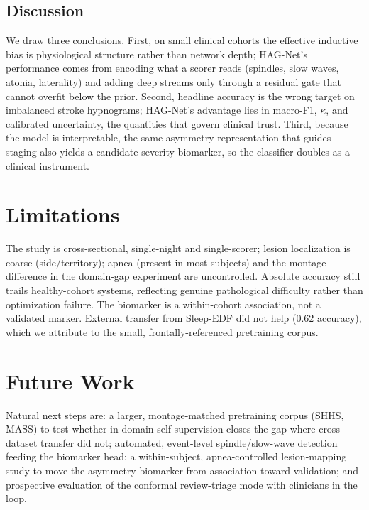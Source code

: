 \documentclass[journal]{IEEEtran}
\begin{document}
\subsection{Discussion}
We draw three conclusions. First, on small clinical cohorts the effective
inductive bias is physiological structure rather than network depth; HAG-Net's
performance comes from encoding what a scorer reads (spindles, slow waves, atonia,
laterality) and adding deep streams only through a residual gate that cannot overfit
below the prior. Second, headline accuracy is the wrong target on imbalanced stroke
hypnograms; HAG-Net's advantage lies in macro-F1, $\kappa$, and calibrated
uncertainty, the quantities that govern clinical trust. Third, because the model is
interpretable, the same asymmetry representation that guides staging also yields a
candidate severity biomarker, so the classifier doubles as a clinical instrument.

\section{Limitations}
The study is cross-sectional, single-night and single-scorer; lesion localization
is coarse (side/territory); apnea (present in most subjects) and the montage
difference in the domain-gap experiment are uncontrolled. Absolute accuracy still
trails healthy-cohort systems, reflecting genuine pathological difficulty rather
than optimization failure. The biomarker is a within-cohort association, not a
validated marker. External transfer from Sleep-EDF did not help (0.62 accuracy),
which we attribute to the small, frontally-referenced pretraining corpus.

\section{Future Work}
Natural next steps are: a larger, montage-matched pretraining corpus (SHHS, MASS) to
test whether in-domain self-supervision closes the gap where cross-dataset transfer
did not; automated, event-level spindle/slow-wave detection feeding the biomarker
head; a within-subject, apnea-controlled lesion-mapping study to move the asymmetry
biomarker from association toward validation; and prospective evaluation of the
conformal review-triage mode with clinicians in the loop.

\end{document}
